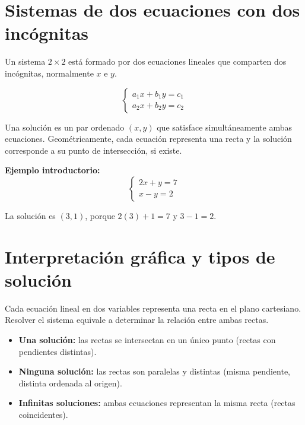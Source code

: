 \documentclass[12pt]{article}
\begin{document}
\newpage

\section{Sistemas de dos ecuaciones con dos incógnitas}

Un sistema \(2\times 2\) está formado por dos ecuaciones lineales que comparten dos incógnitas, normalmente \(x\) e \(y\).

\[
\begin{cases}
a_1 x + b_1 y = c_1 \\
a_2 x + b_2 y = c_2
\end{cases}
\]

Una solución es un par ordenado \((x,y)\) que satisface simultáneamente ambas ecuaciones. Geométricamente, cada ecuación representa una recta y la solución corresponde a su punto de intersección, si existe.

\textbf{Ejemplo introductorio:}
\[
\begin{cases}
2x + y = 7 \\
x - y = 2
\end{cases}
\]

La solución es \((3,1)\), porque \(2(3)+1=7\) y \(3-1=2\).

\section{Interpretación gráfica y tipos de solución}

Cada ecuación lineal en dos variables representa una recta en el plano cartesiano. Resolver el sistema equivale a determinar la relación entre ambas rectas.

\begin{itemize}
  \item \textbf{Una solución:} las rectas se intersectan en un único punto (rectas con pendientes distintas).
  \item \textbf{Ninguna solución:} las rectas son paralelas y distintas (misma pendiente, distinta ordenada al origen).
  \item \textbf{Infinitas soluciones:} ambas ecuaciones representan la misma recta (rectas coincidentes).
\end{itemize}
\end{document}
